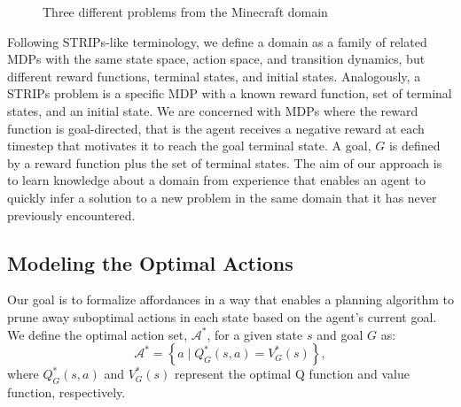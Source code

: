 \documentclass[letterpaper]{article}
\begin{document}
\begin{figure}[b]
\centering
{}
  \caption{Three different problems from the Minecraft domain}
  \label{fig:minecraft}
\end{figure}

Following STRIPs-like terminology, we define a domain as a family of
related MDPs with the same state space, action space, and transition
dynamics, but different reward functions, terminal states, and initial
states.  Analogously, a
STRIPs problem is a specific MDP with a known reward function, set
of terminal states, and an initial state.  We are
concerned with MDPs where the reward function is goal-directed, that
is the agent receives a negative reward at each timestep that motivates
it to reach the goal terminal state.  A goal, $G$ is
defined by a reward function plus the set of terminal states.  The aim
of our approach is to learn knowledge about a domain from experience
that enables an agent to quickly infer a solution to a new problem in
the same domain that it has never previously encountered.


\subsection{Modeling the Optimal Actions}

Our goal is to formalize affordances in a way that enables a planning
algorithm to prune away suboptimal actions in each state based on the
agent's current goal. We define the optimal action set,
$\mathcal{A}^*$, for a given state $s$ and goal $G$ as:
\begin{equation}
\mathcal{A}^* = \left\{ a \mid Q^*_G(s,a) = V^*_G(s) \right\}, 
\label{eq:opt_act_set}
\end{equation}
where $Q^*_G(s,a)$ and $V^*_G(s)$ represent the optimal Q function and 
value function, respectively.
\end{document}

